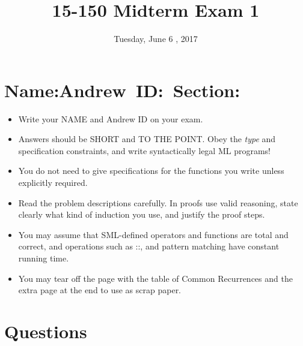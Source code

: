 \documentclass[answers,addpoints,12pt]{exam}
\title{\Huge\bf 15-150 Midterm Exam 1}
\author{Tuesday, June 6 , 2017}
\date{}
\begin{document}
\maketitle

\section*{\mbox{Name:\qquad\qquad\qquad Andrew ID:\qquad\qquad\ Section:}}
\begin{itemize}
\item Write your NAME and Andrew ID on your exam. 

\item Answers should be SHORT and TO THE POINT. Obey the {\it type} and specification constraints, and write syntactically legal ML programs!

\item You do not need to give specifications for the functions you write unless explicitly required.

\item Read the problem descriptions carefully. 
  In proofs use valid reasoning, state clearly what kind of induction you use, and justify the proof steps.

\item You may assume that SML-defined operators and functions are total and correct, and operations such as ::, and pattern matching have constant running time.

\item  You may tear off the page with the table of Common Recurrences and the extra page at the end to use as scrap paper.



\end{itemize}

\vqword{}
\begin{center}
\gradetable[v][questions]
\end{center}

\newpage

\section*{Questions}
\end{document}
